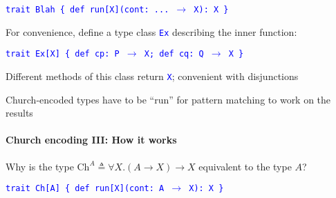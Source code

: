 \texttt{\textcolor{blue}{\footnotesize{}trait Blah \{ def run{[}X{]}(cont: ... $\rightarrow$
X): X \}}}{\footnotesize\par}

For convenience, define a type class \texttt{\textcolor{blue}{\footnotesize{}Ex}}
describing the inner function:

\texttt{\textcolor{blue}{\footnotesize{}trait Ex{[}X{]} \{ def cp: P
$\rightarrow$ X; def cq: Q $\rightarrow$ X \}}}{\footnotesize\par}

Different methods of this class return \texttt{\textcolor{blue}{\footnotesize{}X}};
convenient with disjunctions

Church-encoded types have to be \textsf{``}run\textsf{''} for pattern matching to
work on the results


\paragraph{Church encoding III: How it works}

Why is the type $\text{Ch}^{A}\triangleq\forall X.\left(A\rightarrow X\right)\rightarrow X$
equivalent to the type $A$?

\texttt{\textcolor{blue}{\footnotesize{}trait Ch{[}A{]} \{ def run{[}X{]}(cont: A
$\rightarrow$ X): X \}}}{\footnotesize\par}

